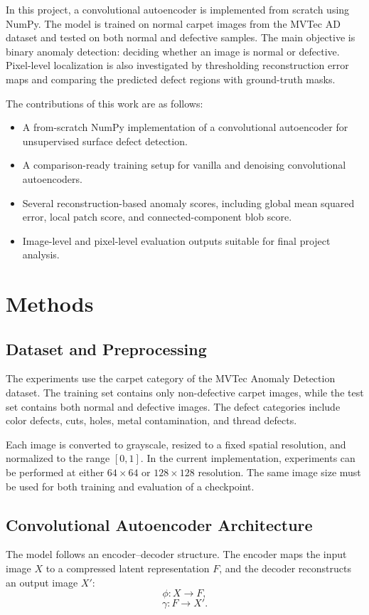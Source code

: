 \documentclass[conference]{IEEEtran}
\begin{document}
In this project, a convolutional autoencoder is implemented from scratch using NumPy. The model is trained on normal carpet images from the MVTec AD dataset and tested on both normal and defective samples. The main objective is binary anomaly detection: deciding whether an image is normal or defective. Pixel-level localization is also investigated by thresholding reconstruction error maps and comparing the predicted defect regions with ground-truth masks.

The contributions of this work are as follows:
\begin{itemize}
    \item A from-scratch NumPy implementation of a convolutional autoencoder for unsupervised surface defect detection.
    \item A comparison-ready training setup for vanilla and denoising convolutional autoencoders.
    \item Several reconstruction-based anomaly scores, including global mean squared error, local patch score, and connected-component blob score.
    \item Image-level and pixel-level evaluation outputs suitable for final project analysis.
\end{itemize}

\section{Methods}
\subsection{Dataset and Preprocessing}
The experiments use the carpet category of the MVTec Anomaly Detection dataset. The training set contains only non-defective carpet images, while the test set contains both normal and defective images. The defect categories include color defects, cuts, holes, metal contamination, and thread defects.

Each image is converted to grayscale, resized to a fixed spatial resolution, and normalized to the range $[0,1]$. In the current implementation, experiments can be performed at either $64 \times 64$ or $128 \times 128$ resolution. The same image size must be used for both training and evaluation of a checkpoint.

\subsection{Convolutional Autoencoder Architecture}
The model follows an encoder--decoder structure. The encoder maps the input image $X$ to a compressed latent representation $F$, and the decoder reconstructs an output image $X'$:
\begin{equation}
    \phi: X \rightarrow F,
\end{equation}
\begin{equation}
    \gamma: F \rightarrow X'.
\end{equation}
\end{document}
